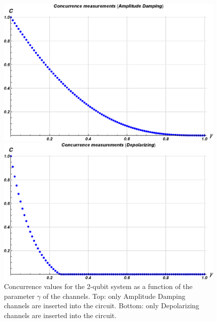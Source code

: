 \begin{figure}[h!]
\begin{minipage}[c]{0.5\linewidth}
\hspace{1cm}
\centering \includegraphics[width=1\textwidth]{./chapter3/Cirq_nuovo/concurrence/Concurrence_Amplitude.eps}
\end{minipage}
\begin{minipage}[]{0.5\linewidth}
\centering \includegraphics[width=1\textwidth]{./chapter3/Cirq_nuovo/concurrence/Concurrence_Depolarizing.eps}
\end{minipage}
\caption{\label{Concurrence_entrambi} Concurrence values for the 2-qubit system as a function of the parameter $\gamma$ of the channels. Top: only Amplitude Damping channels are inserted into the circuit. Bottom: only Depolarizing channels are inserted into the circuit. }
\end{figure}




